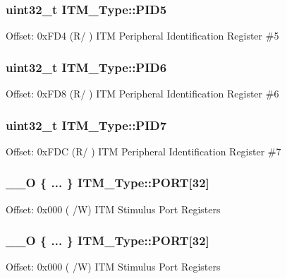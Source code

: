 \subsubsection[{\texorpdfstring{P\+I\+D5}{PID5}}]{ uint32\+\_\+t I\+T\+M\+\_\+\+Type\+::\+P\+I\+D5}\hypertarget{structITM__Type_a9353055ceb7024e07d59248e54502cb9}{}\label{structITM__Type_a9353055ceb7024e07d59248e54502cb9}
Offset\+: 0x\+F\+D4 (R/ ) I\+TM Peripheral Identification Register \#5 
\subsubsection[{\texorpdfstring{P\+I\+D6}{PID6}}]{ uint32\+\_\+t I\+T\+M\+\_\+\+Type\+::\+P\+I\+D6}\hypertarget{structITM__Type_a755c0ec919e7dbb5f7ff05c8b56a3383}{}\label{structITM__Type_a755c0ec919e7dbb5f7ff05c8b56a3383}
Offset\+: 0x\+F\+D8 (R/ ) I\+TM Peripheral Identification Register \#6 
\subsubsection[{\texorpdfstring{P\+I\+D7}{PID7}}]{ uint32\+\_\+t I\+T\+M\+\_\+\+Type\+::\+P\+I\+D7}\hypertarget{structITM__Type_aa31ca6bb4b749201321b23d0dbbe0704}{}\label{structITM__Type_aa31ca6bb4b749201321b23d0dbbe0704}
Offset\+: 0x\+F\+DC (R/ ) I\+TM Peripheral Identification Register \#7 
\subsubsection[{\texorpdfstring{P\+O\+RT}{PORT}}]{\setlength{\rightskip}{0pt plus 5cm}\+\_\+\+\_\+O \{ ... \}    I\+T\+M\+\_\+\+Type\+::\+P\+O\+RT\mbox{[}32\mbox{]}}\hypertarget{structITM__Type_a96808ab17ce10e7e07731cb443fccc46}{}\label{structITM__Type_a96808ab17ce10e7e07731cb443fccc46}
Offset\+: 0x000 ( /W) I\+TM Stimulus Port Registers 
\subsubsection[{\texorpdfstring{P\+O\+RT}{PORT}}]{\setlength{\rightskip}{0pt plus 5cm}\+\_\+\+\_\+O \{ ... \}    I\+T\+M\+\_\+\+Type\+::\+P\+O\+RT\mbox{[}32\mbox{]}}\hypertarget{structITM__Type_a741e09c546e1c710a0398b4e13673bef}{}\label{structITM__Type_a741e09c546e1c710a0398b4e13673bef}
Offset\+: 0x000 ( /W) I\+TM Stimulus Port Registers 
